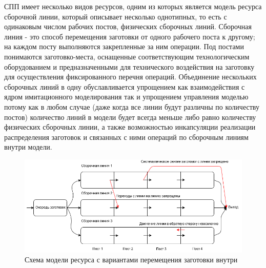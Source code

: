 
\indent СПП имеет несколько видов ресурсов, одним из которых является модель ресурса сборочной линии, который описывает несколько однотипных, то есть с одинаковым числом рабочих постов, физических сборочных линий.
Сборочная линия - это способ перемещения заготовки от одного рабочего поста к другому; на каждом посту выполняются закрепленные за ним операции.
Под постами понимаются заготовко-места, оснащенные соответствующим технологическим оборудованием и предназначенными для технического воздействия на заготовку для осуществления фиксированного перечня операций.
Объединение нескольких сборочных линий в одну обуславливается упрощением как взаимодействия с ядром имитационного моделирования так и упрощением управления моделью потому как в любом случае (даже когда все линии будут различны по количеству постов) количество линий в модели будет всегда меньше либо равно количеству физических сборочных линии, а также возможностью инкапсуляции реализации распределения заготовок и связанных с ними операций по сборочным линиям внутри модели.

\begin{figure}[h]
	\includegraphics[width=\linewidth]{pics/assemblyMain.png}
	\caption{Схема модели ресурса с вариантами перемещения заготовки внутри}
	\label{fig:assemblyMain}
\end{figure}

